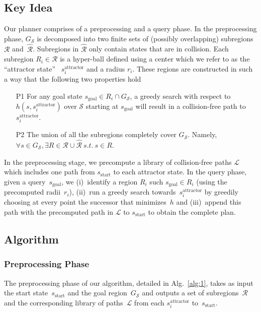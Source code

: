 \documentclass[letterpaper]{article} %
\newcommand{\calL}{\ensuremath{\mathcal{L}}\xspace}
\newcommand{\calS}{\ensuremath{\mathcal{S}}\xspace}
\newcommand{\calR}{\ensuremath{\mathcal{R}}\xspace}
\newcommand{\sAttract}{\ensuremath{s^{\text{attractor}}_i}\xspace}
\newcommand{\sStart}{\ensuremath{s_{\text{start}}\xspace}}
\newcommand{\sGoal}{\ensuremath{s_{\text{goal}}\xspace}}
\begin{document}
\subsection{Key Idea}
Our planner comprises of a preprocessing and a query phase. 
In the preprocessing phase, $G_\calS$ is decomposed into two finite  sets of (possibly overlapping) subregions $\calR$ and~$\hat{\calR}$.
Subregions in $\hat{\calR}$ only contain states that are in collision.
Each subregion $R_i \in \calR$ is a hyper-ball defined using a center which we refer to as the ``attractor state''~
\sAttract and a radius $r_i$.
These regions are constructed in such a way that the following two properties hold
\begin{enumerate}
  \item[P1] For any goal state $s_{\text{goal}} \in R_i \cap G_\calS$, a greedy search with respect to $h(s, \sAttract)$ over $\calS$ starting at $\sGoal$ will result in a collision-free path to \sAttract.
  \item[P2] The union of all the subregions completely cover $G_\calS$. 
		  Namely, $\forall s \in G_\calS, \exists R \in \calR \cup \hat{\calR} \ s.t. \ s \in R$.
\end{enumerate}

In the preprocessing stage, we precompute a library of collision-free paths $\calL$ which includes one path from $\sStart$ to each attractor state. 
In the query phase, given a query~\sGoal, we 
(i)~identify a region $R_i$ such $\sGoal \in R_i$ (using the precomputed radii~$r_i$),
(ii)~run a greedy search towards~\sAttract by greedily choosing at every point the successor that minimizes~$h$ and
(iii)~append this path with the precomputed path in $\calL$ to $\sStart$ to obtain the complete plan.

\subsection {Algorithm}
\subsubsection{Preprocessing Phase}
The preprocessing phase of our algorithm, detailed in Alg.~\ref{alg:1}, takes as input the start state~$\sStart$ and the goal region~$G_\calS$ and outputs a set of subregions~$\calR$ and the corresponding library of paths~$\calL$ from each \sAttract to~\sStart. 
\end{document}
